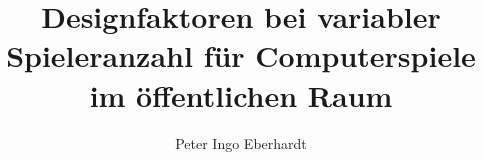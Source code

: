 \documentclass[bachelor,german]{hgbthesis}
\title{Designfaktoren bei variabler Spieleranzahl für Computerspiele im öffentlichen Raum}
\author{Peter Ingo Eberhardt}
\begin{document}

\frontmatter                    %

\maketitle
\tableofcontents

		
			

\mainmatter          %



\MakeBibliography                        %

\end{document}
